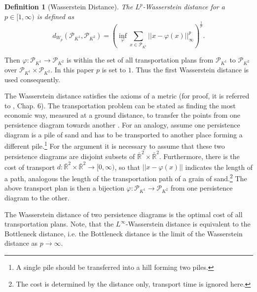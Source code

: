 \documentclass[journal]{IEEEtran}
\newtheorem{definition}{Definition}[section]
\begin{document}
\begin{definition}[Wasserstein Distance]
The $L^p$-Wasserstein distance for a $p \in [1,\infty)$ is defined as
\begin{equation}
  d_{W_p}(\mathcal{P}_{K^1},\mathcal{P}_{K^2}) = \left(\inf_{\varphi} \sum_{x \in \mathcal{P}_{K^1}} ||x-\varphi(x)||^p_\infty\right)^{\frac{1}{p}}.
\end{equation}
\end{definition}

Then $\varphi: \mathcal{P}_{K^1}\rightarrow \mathcal{P}_{K^2}$ is within the set of all transportation plans from $\mathcal{P}_{K^1}$ to $\mathcal{P}_{K^2}$ over $\mathcal{P}_{K^1} \times \mathcal{P}_{K^2}$. In this paper $p$ is set to $1$. Thus the first Wasserstein distance is used consequently.

The Wasserstein distance satisfies the axioms of a metric (for proof, it is referred to \cite{villani2008optimal}, Chap. 6). The transportation problem can be stated as finding the most economic way, measured at a ground distance, to transfer the points from one persistence diagram towards another \cite{togninalli2019wasserstein}.
For an analogy, assume one persistence diagram is a pile of sand and has to be transported to another place forming a different pile.\footnote{A single pile  should be transferred into a hill forming two piles.} For the argument it is necessary to assume that these two persistence diagrams are disjoint subsets of $\bar{\mathbb{R}}^2 \times \bar{\mathbb{R}}^2$. Furthermore, there is the cost of transport $d: \bar{\mathbb{R}}^2 \times \bar{\mathbb{R}}^2 \rightarrow [0,\infty)$, so that $||x-\varphi(x)||$ indicates the length of a path, analogous the length of the transportation path of a grain of sand.\footnote{The cost is determined by the distance only, transport time is ignored here.} The above transport plan is then a bijection $\varphi: \mathcal{P}_{K^1} \rightarrow \mathcal{P}_{K^2}$ from one persistence diagram to the other.

The Wasserstein distance of two persistence diagrams is the optimal cost of all transportation plans. Note, that the $L^\infty$-Wasserstein distance is equivalent to the Bottleneck distance, i.e. the Bottleneck distance is the limit of the Wasserstein distance as $p \rightarrow \infty$.
\end{document}
